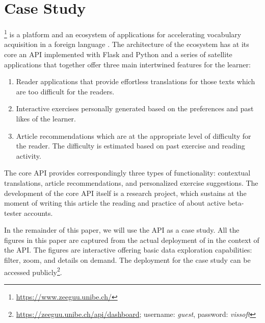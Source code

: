 \documentclass{sig-alternate-05-2015}
\begin{document}

\section{Case Study}
\label{sec:case}


  \zee\footnote{\url{https://www.zeeguu.unibe.ch/}} is a platform and an ecosystem of applications for accelerating vocabulary acquisition in a foreign language \cite{Lungu16}. 
%
  The architecture of the ecosystem has at its core an API implemented with Flask and Python and a series of satellite applications that together offer three main intertwined features for the learner:

  \begin{enumerate}

    \item Reader applications that provide effortless translations for those texts which are too difficult for the readers.

    \item Interactive exercises personally generated based on the preferences and past likes of the learner.

    \item Article recommendations which are at the appropriate level of difficulty for the reader. The difficulty is estimated based on past exercise and reading activity.

  \end{enumerate}

  The core API provides correspondingly three types of functionality: contextual translations, article recommendations, and personalized exercise suggestions. The development of the core API itself is a research project, which sustains at the moment of writing this article the reading and practice of about \activeUserCount active beta-tester accounts. 

  In the remainder of this paper, we will use the \zee API as a case study. All the figures in this paper are captured from the actual deployment of \tool in the context of the \zee API. The figures are interactive offering basic data exploration capabilities: filter, zoom, and details on demand\cite{Shne99a}. The \tool deployment for the case study can be accessed publicly\footnote{\url{https://zeeguu.unibe.ch/api/dashboard}; username: {\em guest}, password: {\em vissoft}}. 
\end{document}
